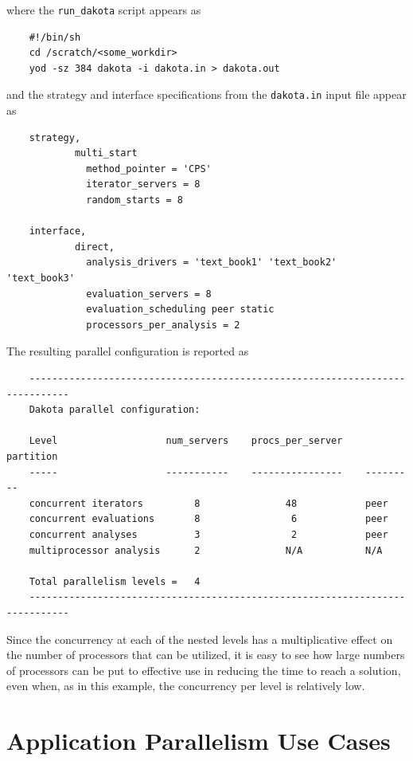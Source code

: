 where the \texttt{run\_dakota} script appears as
\begin{small}
\begin{verbatim}
    #!/bin/sh
    cd /scratch/<some_workdir>
    yod -sz 384 dakota -i dakota.in > dakota.out
\end{verbatim}
\end{small}

and the strategy and interface specifications from the
\texttt{dakota.in} input file appear as
\begin{small}
\begin{verbatim}
    strategy,
            multi_start
              method_pointer = 'CPS'
              iterator_servers = 8
              random_starts = 8

    interface,
            direct,
              analysis_drivers = 'text_book1' 'text_book2' 'text_book3'
              evaluation_servers = 8
              evaluation_scheduling peer static
              processors_per_analysis = 2
\end{verbatim}
\end{small}

The resulting parallel configuration is reported as
\begin{small}
\begin{verbatim}
    -----------------------------------------------------------------------------
    Dakota parallel configuration:

    Level                   num_servers    procs_per_server    partition
    -----                   -----------    ----------------    ---------
    concurrent iterators         8               48            peer
    concurrent evaluations       8                6            peer
    concurrent analyses          3                2            peer
    multiprocessor analysis      2               N/A           N/A

    Total parallelism levels =   4
    -----------------------------------------------------------------------------
\end{verbatim}
\end{small}

Since the concurrency at each of the nested levels has a
multiplicative effect on the number of processors that can be
utilized, it is easy to see how large numbers of processors can be put
to effective use in reducing the time to reach a solution, even when,
as in this example, the concurrency per level is relatively low.


\section{Application Parallelism Use Cases}\label{parallel:application}

